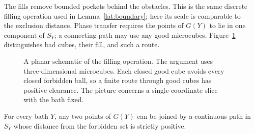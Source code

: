 The fills remove bounded pockets behind the obstacles. This is the same
discrete filling operation used in Lemma~\ref{lat:boundary}; here its scale
is comparable to the exclusion distance. Phase transfer requires the
points of $G(Y)$ to lie in one component of $S_Y$; a connecting path
may use any good microcubes. Figure~\ref{geom:figure} distinguishes bad
cubes, their fill, and such a route.

\begin{figure}[t]
\centering
{}
\caption{A planar schematic of the filling operation. The argument uses
three-dimensional microcubes. Each closed good cube avoids every closed
forbidden ball, so a finite route through good cubes has positive clearance.
The picture concerns a single-coordinate slice with the bath fixed.}
\label{geom:figure}
\end{figure}

\begin{lemma}\label{geom:connectivity}
For every bath $Y$, any two points of $G(Y)$ can be joined by a continuous
path in $S_Y$ whose distance from the forbidden set is strictly positive.
\end{lemma}

